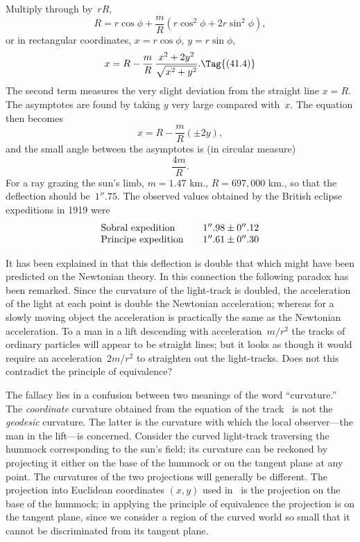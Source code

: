 \documentclass[12pt]{book}
\begin{document}
Multiply through by~$rR$,
\[
R = r\cos\phi + \frac{m}{R} (r\cos^{2}\phi + 2r\sin^{2}\phi),
\]
or in rectangular coordinates, $x = r\cos\phi$, $y = r\sin\phi$,
\[
x = R - \frac{m}{R}\, \frac{x^{2} + 2y^{2}}{\sqrt{x^{2} + y^{2}}}.
\Tag{(41.4)}
\]
The second term measures the very slight deviation from the straight line
$x = R$. The asymptotes are found by taking $y$ very large compared with~$x$.
The equation then becomes
\[
x = R - \frac{m}{R}(\pm2y),
\]
and the small angle between the asymptotes is (in circular measure)
\[
\frac{4m}{R}.
\]
For a ray grazing the sun's limb, $m = 1.47$ km., $R = 697,000$ km., so that the
%
deflection should be~$1''.75$. The observed values obtained by the British
eclipse expeditions in 1919 were
\[
\begin{array}{l@{\qquad}c}
\text{Sobral expedition} & 1''.98 \pm 0''.12 \\
\text{Principe expedition} & 1''.61 \pm 0''.30 \\
\end{array}
\]

It has been explained in  that this deflection
is double that which might have been predicted on the Newtonian theory.
In this connection the following paradox has been remarked. Since the curvature
of the light-track is doubled, the acceleration of the light at each point
is double the Newtonian acceleration; whereas for a slowly moving object the
acceleration is practically the same as the Newtonian acceleration. To a man
in a lift descending with acceleration~$m/r^{2}$ the tracks of ordinary particles will
appear to be straight lines; but it looks as though it would require an acceleration~$2m/r^{2}$
to straighten out the light-tracks. Does not this contradict the
principle of equivalence?

The fallacy lies in a confusion between two meanings of the word ``curvature.''
%
%
%
The \emph{coordinate} curvature obtained from the equation of the track~
is not the \emph{geodesic} curvature. The latter is the curvature with which the local
observer---the man in the lift---is concerned. Consider the curved light-track
traversing the hummock corresponding to the sun's field; its curvature can be
reckoned by projecting it either on the base of the hummock or on the tangent
plane at any point. The curvatures of the two projections will generally be
different. The projection into Euclidean coordinates $(x, y)$ used in~ is the
projection on the base of the hummock; in applying the principle of equivalence
the projection is on the tangent plane, since we consider a region of the
curved world so small that it cannot be discriminated from its tangent plane.
\end{document}
